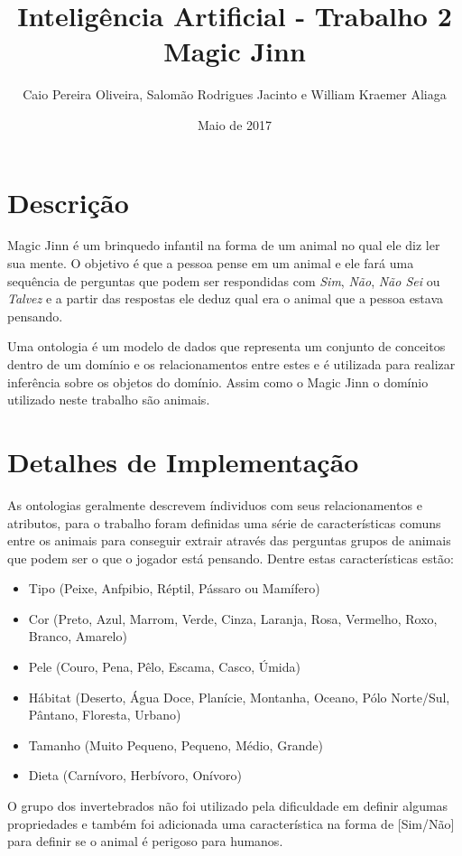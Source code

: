 \documentclass{article}
\title{Inteligência Artificial - Trabalho 2\\Magic Jinn}
\author{Caio Pereira Oliveira, Salomão Rodrigues Jacinto e William Kraemer Aliaga}
\date{Maio de 2017}
\begin{document}
\maketitle

\section{Descrição}

Magic Jinn é um brinquedo infantil na forma de um animal no qual ele diz ler sua mente. O objetivo é que a pessoa pense em um animal e ele fará uma sequência de perguntas que podem ser respondidas com  \textit{Sim}, \textit{Não}, \textit{Não Sei} ou \textit{Talvez} e a partir das respostas ele deduz qual era o animal que a pessoa estava pensando.

Uma ontologia é um modelo de dados que representa um conjunto de conceitos dentro de um domínio e os relacionamentos entre estes e é utilizada para realizar inferência sobre os objetos do domínio. Assim como o Magic Jinn o domínio utilizado neste trabalho são animais.


\section{Detalhes de Implementação}

As ontologias geralmente descrevem índividuos com seus relacionamentos e atributos, para o trabalho foram definidas uma série de características comuns entre os animais para conseguir extrair através das perguntas grupos de animais que podem ser o que o jogador está pensando. Dentre estas características estão:

\begin{itemize}
    \item Tipo (Peixe, Anfpibio, Réptil, Pássaro ou  Mamífero)
    \item Cor (Preto, Azul, Marrom, Verde, Cinza, Laranja, Rosa, Vermelho, Roxo, Branco, Amarelo)
    \item Pele (Couro, Pena, Pêlo, Escama, Casco, Úmida)
    \item Hábitat (Deserto, Água Doce, Planície, Montanha, Oceano, Pólo Norte/Sul, Pântano, Floresta, Urbano)
    \item Tamanho (Muito Pequeno, Pequeno, Médio, Grande)
    \item Dieta (Carnívoro, Herbívoro, Onívoro)
\end{itemize}

O grupo dos invertebrados não foi utilizado pela dificuldade em definir algumas propriedades e também foi adicionada uma característica na forma de [Sim/Não] para definir se o animal é perigoso para humanos.
\end{document}
